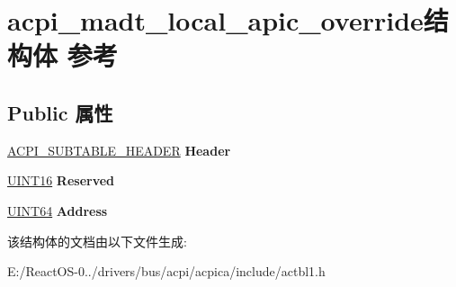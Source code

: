 \hypertarget{structacpi__madt__local__apic__override}{}\section{acpi\+\_\+madt\+\_\+local\+\_\+apic\+\_\+override结构体 参考}
\label{structacpi__madt__local__apic__override}
\subsection*{Public 属性}
\begin{DoxyCompactItemize}
\item 
\mbox{\label{structacpi__madt__local__apic__override_ace090ebe283b355e25358eedee47ce7d}} 
\hyperlink{structacpi__subtable__header}{A\+C\+P\+I\+\_\+\+S\+U\+B\+T\+A\+B\+L\+E\+\_\+\+H\+E\+A\+D\+ER} {\bfseries Header}
\item 
\mbox{\label{structacpi__madt__local__apic__override_aa0f3a4adf465c0b9da91b2956601c75c}} 
\hyperlink{_processor_bind_8h_a09f1a1fb2293e33483cc8d44aefb1eb1}{U\+I\+N\+T16} {\bfseries Reserved}
\item 
\mbox{\label{structacpi__madt__local__apic__override_ac43ff0fed3f4937348ea022ed5027738}} 
\hyperlink{_processor_bind_8h_a57be03562867144161c1bfee95ca8f7c}{U\+I\+N\+T64} {\bfseries Address}
\end{DoxyCompactItemize}


该结构体的文档由以下文件生成\+:\begin{DoxyCompactItemize}
\item 
E\+:/\+React\+O\+S-\/0../drivers/bus/acpi/acpica/include/actbl1.\+h\end{DoxyCompactItemize}
